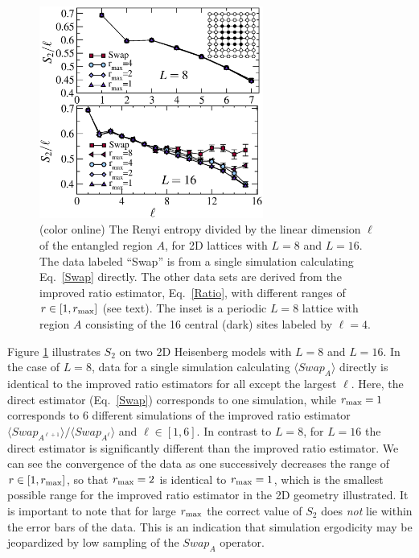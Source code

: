 \documentclass[prl,aps,twocolumn,floatfix,amsmath,amssymb,superscriptaddress,tightenlines]{revtex4}
\begin{document}
\begin{figure} {
\includegraphics[width=2.9in]{L8n16_ratio.eps} \caption{(color online) 
\label{L16fig}
The Renyi entropy divided by the linear dimension $\ell$ of the entangled region $A$, for 2D lattices with $L=8$ and $L=16$.  The data labeled ``Swap'' is from a single simulation calculating Eq.~\eqref{Swap} directly.  The other
data sets are derived from the improved ratio estimator, Eq.~\eqref{Ratio}, with different ranges of $r \in [1,r_{\rm max}]$ (see text).  The inset 
is a periodic $L=8$ lattice with region $A$ consisting of the 16 central (dark) sites labeled by $\ell = 4$.
}
} \end{figure}

Figure \ref{L16fig} illustrates $S_2$ on two 2D Heisenberg models with  $L=8$ and  $L=16$.  In the case of $L=8$, data for a single 
simulation calculating $\langle Swap_A \rangle$ directly is identical to the improved ratio estimators for all except the largest $\ell$.  
Here, the direct estimator (Eq.~\eqref{Swap}) corresponds to one simulation, while $r_{\rm max}=1$ corresponds to 6 different simulations of the improved ratio estimator ${\langle Swap_{A^{\ell+1}}\rangle}/{\langle Swap_{A^{\ell}}\rangle}$ and $\ell \in [1,6]$.
In contrast to $L=8$, for $L=16$ the direct estimator is significantly different than 
the improved ratio estimator.  We can see the convergence of the data as one successively decreases the range of $r \in [1,r_{\rm max}]$, 
so that $r_{\rm max}=2$ is identical to $r_{\rm max}=1$, which is the smallest possible range for the improved ratio estimator in the 2D geometry illustrated.  It is important to note that for large $r_{\rm max}$ the correct value of $S_2$ does {\it not} lie within the error bars of the data.  
This is an indication that simulation ergodicity may be jeopardized by low sampling of the $Swap_A$ operator.%
\end{document}
